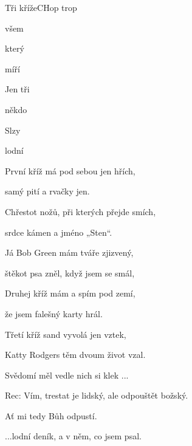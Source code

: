 \setcounter{page}{93}
\begin{song}{Tři kříže}{C}{Hop trop}

\begin{SBVerse}

všem 

který 


míří 

\end{SBVerse}

\begin{SBChorus}

Jen tři 

někdo 

Slzy 

lodní 

\end{SBChorus}

\begin{SBVerse}

První kříž má pod sebou jen hřích, 

samý pití a rvačky jen.

Chřestot nožů, při kterých přejde smích, 

srdce kámen a jméno „Sten“.

\end{SBVerse}

\begin{SBVerse}

Já Bob Green mám tváře zjizvený, 

štěkot psa zněl, když jsem se smál,

Druhej kříž mám a spím pod zemí, 

že jsem falešný karty hrál.

\end{SBVerse}

\begin{SBVerse}

Třetí kříž sand vyvolá jen vztek, 

Katty Rodgers těm dvoum život vzal.

Svědomí měl vedle nich si klek ...

\end{SBVerse}
\begin{SBChorus*}
Rec: Vím, trestat je lidský, ale odpouštět božský. 

Ať mi tedy Bůh odpustí.
\end{SBChorus*}
\begin{SBChorus}

...lodní deník, a v něm, co jsem psal.

\end{SBChorus}
\end{song}

\pagebreak
